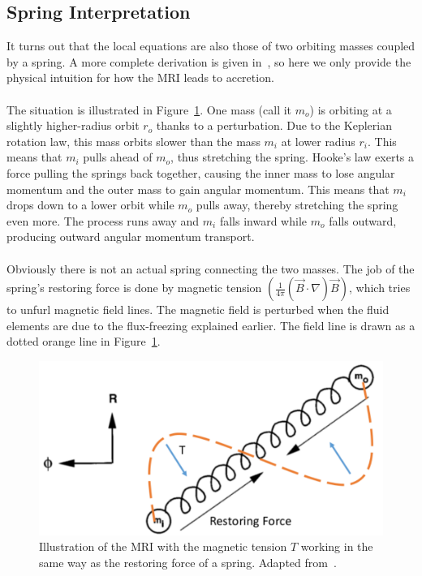\subsection{Spring Interpretation}\label{ssec:springs}
It turns out that the local equations are also those of two orbiting masses coupled by a spring. A more complete derivation is given in~, so here we only provide the physical intuition for how the MRI leads to accretion. \\
\\
The situation is illustrated in Figure~\ref{fig:springs}. One mass (call it $m_o$) is orbiting at a slightly higher-radius orbit $r_o$ thanks to a perturbation. Due to the Keplerian rotation law, this mass orbits slower than the mass $m_i$ at lower radius $r_i$. This means that $m_i$ pulls ahead of $m_o$, thus stretching the spring. Hooke's law exerts a force pulling the springs back together, causing the inner mass to lose angular momentum and the outer mass to gain angular momentum. This means that $m_i$ drops down to a lower orbit while $m_o$ pulls away, thereby stretching the spring even more. The process runs away and $m_i$ falls inward while $m_o$ falls outward, producing outward angular momentum transport. \\
\\
Obviously there is not an actual spring connecting the two masses. The job of the spring's restoring force is done by magnetic tension $\left(\frac{1}{4\pi}(\vec B\cdot\nabla)\vec B\right)$, which tries to unfurl magnetic field lines. The magnetic field is perturbed when the fluid elements are due to the flux-freezing explained earlier. The field line is drawn as a dotted orange line in Figure~\ref{fig:springs}.
\begin{figure}
  \begin{center}  
    \includegraphics[width=.8\textwidth, angle=0.]{img/mriSpring.pdf}
  \end{center}
  \caption{Illustration of the MRI with the magnetic tension $T$ working in the same way as the restoring force of a spring. Adapted from~.}
  \label{fig:springs}
\end{figure}
%
%
